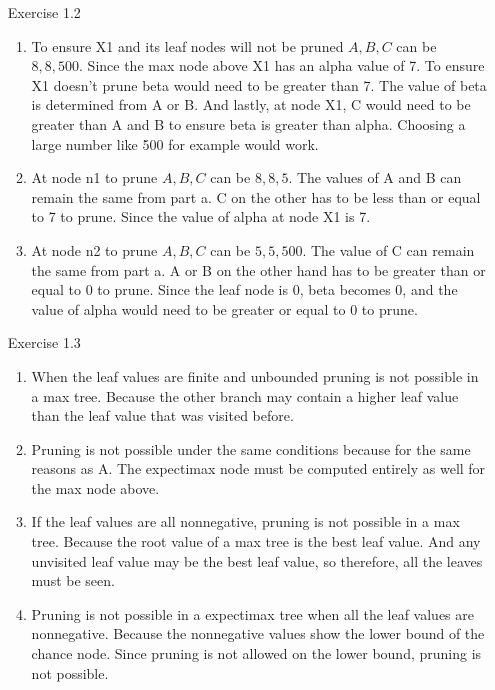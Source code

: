 \documentclass[letterpaper, 12pt]{article}
\begin{document}
\begin{enumerate}
\begin{enumerate}
    \end{enumerate} 
    \item[Exercise 1.2]  
    \begin{enumerate}
        \item To ensure X1 and its leaf nodes will not be pruned $A,B,C$ can be $8,8,500$.
            Since the max node above X1 has an alpha value of 7. To ensure X1 doesn't prune
            beta would need to be greater than 7. The value of beta is determined from A or B.
            And lastly, at node X1, C would need to be greater than A and B to ensure beta is greater
            than alpha. Choosing a large number like 500 for example would work.
        \item At node n1 to prune $A,B,C$ can be $8,8,5$. The values of A and B can remain the same
            from part a. C on the other has to be less than or equal to 7 to prune. Since the value 
            of alpha at node X1 is 7.
        \item At node n2 to prune $A,B,C$ can be $5,5,500$. The value of C can remain the same from part a.
            A or B on the other hand has to be greater than or equal to 0 to prune. Since the leaf node is 0, 
            beta becomes 0, and the value of alpha would need to be greater or equal to 0 to prune.
    \end{enumerate} 
    \item[Exercise 1.3] 
    \begin{enumerate}
        \item When the leaf values are finite and unbounded pruning is not possible in a max tree.
            Because the other branch may contain a higher leaf value than the leaf value that was visited before.
        \item Pruning is not possible under the same conditions because for the same reasons as A. The expectimax node
            must be computed entirely as well for the max node above.
        \item If the leaf values are all nonnegative, pruning is not possible in a max tree. Because the root value of a max tree is the best leaf value. 
        And any unvisited leaf value may be the best leaf value, so therefore, all the leaves must be seen.
        \item Pruning is not possible in a expectimax tree when all the leaf values are nonnegative. 
            Because the nonnegative values show the lower bound of the chance node. Since pruning is not allowed on the lower bound, pruning is not possible.        

\end{enumerate}
\end{enumerate}
\end{document}
